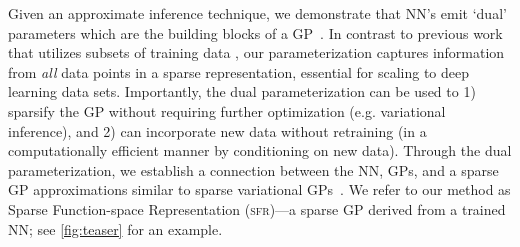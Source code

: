 \documentclass{article}
\makeatletter
\newcommand{\ie}{\textit{i.e.\@}\xspace}
\newcommand{\our}{\textsc{sfr}\xspace}
\makeatother
\begin{document}
Given an approximate inference technique, we demonstrate that NN's emit `dual' parameters which are the building blocks of a GP~\citep{csato2002sparse, adam2021dual, chang2023memory}.
In contrast to previous work that utilizes subsets of training data \citep{immer2021scalable}, our parameterization captures
information from {\em all} data points in a sparse representation, essential for scaling to deep learning data sets.
Importantly, the dual parameterization can be used to 1) sparsify the GP without requiring further optimization
(e.g. variational inference), and 2) can incorporate new data without retraining (in a computationally efficient manner
by conditioning on new data).
Through the dual parameterization, we establish a connection between the NN, GPs, and a sparse GP approximations similar to sparse variational GPs~\citep{titsias2009variational}. We refer to our method as Sparse Function-space Representation (\our)---a sparse GP derived from a trained NN; see \cref{fig:teaser} for an example. %
\end{document}
